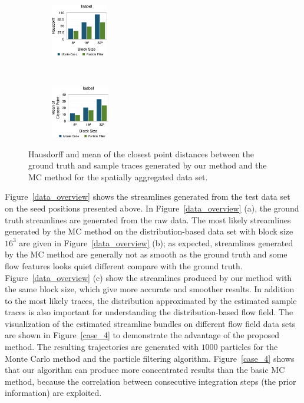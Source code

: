 \begin{figure}[!htb]
  \centering
  \begin{subfigure}[b]{0.24\textwidth}
    \centering
    \includegraphics[height=0.9in]{../figures/isabel_h.eps}
  \end{subfigure}~
  \begin{subfigure}[b]{0.24\textwidth}
    \centering
    \includegraphics[height=0.9in]{../figures/isabel_m.eps}
  \end{subfigure}
  \caption{Hausdorff and mean of the closest point distances between the ground truth and sample traces generated by our method and the MC method for the spatially aggregated data set.}
  \label{berror_r}
\end{figure}

Figure~\ref{data_overview} shows the streamlines generated from the test data set on the seed positions presented above. In Figure~\ref{data_overview} (a), the ground truth streamlines are generated from the raw data. The most likely streamlines generated by the MC method on the distribution-based data set with block size $16^3$ are given in Figure~\ref{data_overview} (b); as expected, streamlines generated by the MC method are generally not as smooth as the ground truth and some flow features looks quiet different compare with the ground truth. Figure~\ref{data_overview} (c) show the streamlines produced by our method with the same block size, which give more accurate and smoother results. In addition to the most likely traces, the distribution approximated by the estimated sample traces is also important for understanding the distribution-based flow field. The visualization of the estimated streamline bundles on different flow field data sets are shown in Figure~\ref{case_4} to demonstrate the advantage of the proposed method. The resulting trajectories are generated with $1000$ particles for the Monte Carlo method and the particle filtering algorithm. Figure~\ref{case_4} shows that our algorithm can produce more concentrated results than the basic MC method, because the correlation between consecutive integration steps (the prior information) are exploited.

